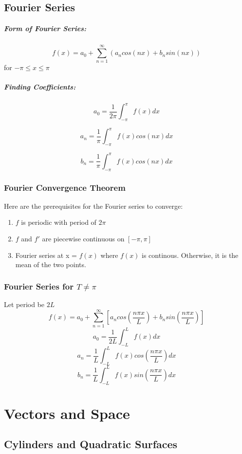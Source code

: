 \documentclass[a4paper,12pt]{report}
\begin{document}
\section{Fourier Series}
\paragraph{Form of Fourier Series: }
$$f(x) = a_0 + \sum_{n=1}^{\infty} (a_n cos(nx) + b_n sin(nx))$$
for $-\pi \leq x \leq \pi$

\paragraph{Finding Coefficients: }
$$a_0 = \frac{1}{2\pi} \int_{-\pi}^{\pi} f(x) dx$$

$$a_n = \frac{1}{\pi} \int_{-\pi}^{\pi} f(x) cos(nx) dx$$

$$b_n = \frac{1}{\pi} \int_{-\pi}^{\pi} f(x) cos(nx) dx$$

\subsection{Fourier Convergence Theorem}
Here are the prerequisites for the Fourier series to converge:
\begin{enumerate}
\item $f$ is periodic with period of $2\pi$
\item $f$ and $f'$ are piecewise continuous on $[-\pi, \pi]$
\item Fourier series at x = $f(x)$ where $f(x)$ is continous. Otherwise, it is the mean of the two points.
\end{enumerate}

\subsection{Fourier Series for $T \neq \pi$}
Let period be $2L$
$$f(x) = a_0 + \sum_{n=1}^{\infty} [a_n cos(\frac{n\pi x}{L}) + b_n sin(\frac{n\pi x}{L})]$$
$$a_0 = \frac{1}{2L} \int_{-L}^{L} f(x) dx$$
$$a_n = \frac{1}{L}\int_{-L}^{L} f(x) cos(\frac{n\pi x}{L}) dx$$
$$b_n = \frac{1}{L}\int_{-L}^{L} f(x) sin(\frac{n\pi x}{L}) dx$$

\chapter{Vectors and Space}
\section{Cylinders and Quadratic Surfaces}
\end{document}
